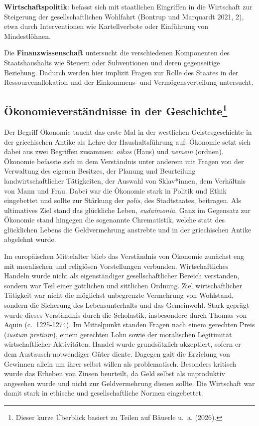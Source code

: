 \documentclass[
  nswissgerman,
  a4paper,
  DIV=11,
  numbers=noendperiod,
  oneside,
  openany]{scrreprt}
\begin{document}
\begin{tcolorbox}
\textbf{Wirtschaftspolitik}: befasst sich mit staatlichen Eingriffen in
die Wirtschaft zur Steigerung der gesellschaftlichen Wohlfahrt (Bontrup
und Marquardt 2021, 2), etwa durch Interventionen wie Kartellverbote
oder Einführung von Mindestlöhnen.

Die \textbf{Finanzwissenschaft} untersucht die verschiedenen Komponenten
des Staatshaushalts wie Steuern oder Subventionen und deren gegenseitige
Beziehung. Dadurch werden hier implizit Fragen zur Rolle des Staates in
der Ressourcenallokation und der Einkommens- und Vermögensverteilung
untersucht.

\end{tcolorbox}

\subsection[Ökonomieverständnisse in der
Geschichte]{\texorpdfstring{Ökonomieverständnisse in der
Geschichte\footnote{Dieser kurze Überblick basiert zu Teilen auf Bäuerle
  u.~a. (2026).}}{Ökonomieverständnisse in der Geschichte}}\label{uxf6konomieverstuxe4ndnisse-in-der-geschichte1_intro-1}

Der Begriff Ökonomie taucht das erste Mal in der westlichen
Geistesgeschichte in der griechischen Antike als Lehre der
Haushaltsführung auf. Ökonomie setzt sich dabei aus zwei Begriffen
zusammen: \emph{oikos} (Haus) und \emph{nemein} (ordnen). Ökonomie
befasste sich in dem Verständnis unter anderem mit Fragen von der
Verwaltung des eigenen Besitzes, der Planung und Beurteilung
landwirtschaftlicher Tätigkeiten, der Auswahl von Sklav*innen, dem
Verhältnis von Mann und Frau. Dabei war die Ökonomie stark in Politik
und Ethik eingebettet und sollte zur Stärkung der \emph{polis}, des
Stadtstaates, beitragen. Als ultimatives Ziel stand das glückliche
Leben, \emph{eudaimonia}. Ganz im Gegensatz zur Ökonomie stand hingegen
die sogenannte Chrematistik, welche statt des glücklichen Lebens die
Geldvermehrung anstrebte und in der griechischen Antike abgelehnt wurde.

Im europäischen Mittelalter blieb das Verständnis von Ökonomie zunächst
eng mit moralischen und religiösen Vorstellungen verbunden.
Wirtschaftliches Handeln wurde nicht als eigenständiger
gesellschaftlicher Bereich verstanden, sondern war Teil einer göttlichen
und sittlichen Ordnung. Ziel wirtschaftlicher Tätigkeit war nicht die
möglichst unbegrenzte Vermehrung von Wohlstand, sondern die Sicherung
des Lebensunterhalts und das Gemeinwohl. Stark geprägt wurde dieses
Verständnis durch die Scholastik, insbesondere durch Thomas von Aquin
(c.~1225-1274). Im Mittelpunkt standen Fragen nach einem gerechten Preis
(\emph{iustum pretium}), einem gerechten Lohn sowie der moralischen
Legitimität wirtschaftlicher Aktivitäten. Handel wurde grundsätzlich
akzeptiert, sofern er dem Austausch notwendiger Güter diente. Dagegen
galt die Erzielung von Gewinnen allein um ihrer selbst willen als
problematisch. Besonders kritisch wurde das Erheben von Zinsen
beurteilt, da Geld selbst als unproduktiv angesehen wurde und nicht zur
Geldvermehrung dienen sollte. Die Wirtschaft war damit stark in ethische
und gesellschaftliche Normen eingebettet.
\end{document}
